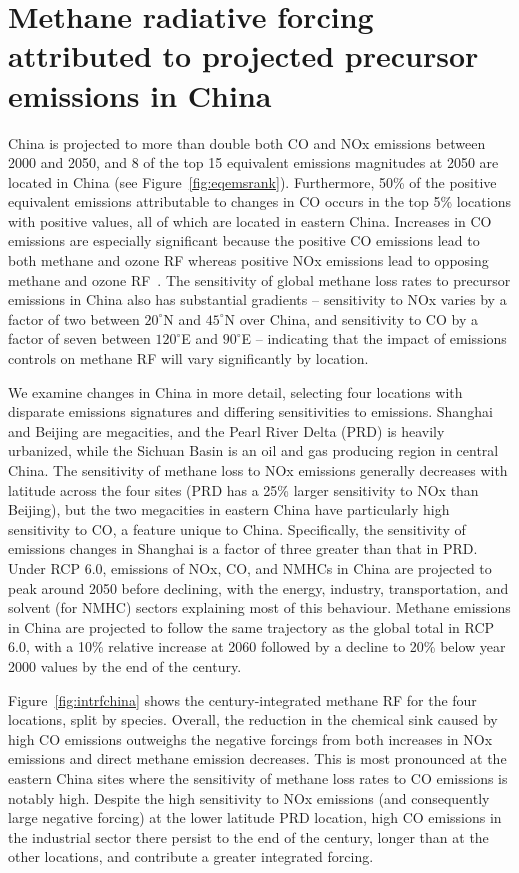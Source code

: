 \section{Methane radiative forcing attributed to projected precursor emissions in China}
\label{sec:china}
China is projected to more than double both CO and NOx emissions between 2000 and 2050, and 8 of the top 15 equivalent emissions magnitudes at 2050 are located in China (see Figure~\ref{fig:eqemsrank}). Furthermore, 50\% of the positive equivalent emissions attributable to changes in CO occurs in the top 5\% locations with positive values, all of which are located in eastern China. Increases in CO emissions are especially significant because the positive CO emissions lead to both methane and ozone RF whereas positive NOx emissions lead to opposing methane and ozone RF~\citep{ref:myhre2013}. The sensitivity of global methane loss rates to precursor emissions in China also has substantial gradients -- sensitivity to NOx varies by a factor of two between $20^{\circ}$N and $45^{\circ}$N over China, and sensitivity to CO by a factor of seven between $120^{\circ}$E and $90^{\circ}$E -- indicating that the impact of emissions controls on methane RF will vary significantly by location.

We examine changes in China in more detail, selecting four locations with disparate emissions signatures and differing sensitivities to emissions. Shanghai and Beijing are megacities, and the Pearl River Delta (PRD) is heavily urbanized, while the Sichuan Basin is an oil and gas producing region in central China. The sensitivity of methane loss to NOx emissions generally decreases with latitude across the four sites (PRD has a 25\% larger sensitivity to NOx than Beijing), but the two megacities in eastern China have particularly high sensitivity to CO, a feature unique to China. Specifically, the sensitivity of  emissions changes in Shanghai is a factor of three greater than that in PRD. Under RCP 6.0, emissions of NOx, CO, and NMHCs in China are projected to peak around 2050 before declining, with the energy, industry, transportation, and solvent (for NMHC) sectors explaining most of this behaviour. Methane emissions in China are projected to follow the same trajectory as the global total in RCP 6.0, with a 10\% relative increase at 2060 followed by a decline to 20\% below year 2000 values by the end of the century.

Figure~\ref{fig:intrfchina} shows the century-integrated methane RF for the four locations, split by species. Overall, the reduction in the chemical sink caused by high CO emissions outweighs the negative forcings from both increases in NOx emissions and direct methane emission decreases. This is most pronounced at the eastern China sites where the sensitivity of methane loss rates to CO emissions is notably high. Despite the high sensitivity to NOx emissions (and consequently large negative forcing) at the lower latitude PRD location, high CO emissions in the industrial sector there persist to the end of the century, longer than at the other locations, and contribute a greater integrated forcing.